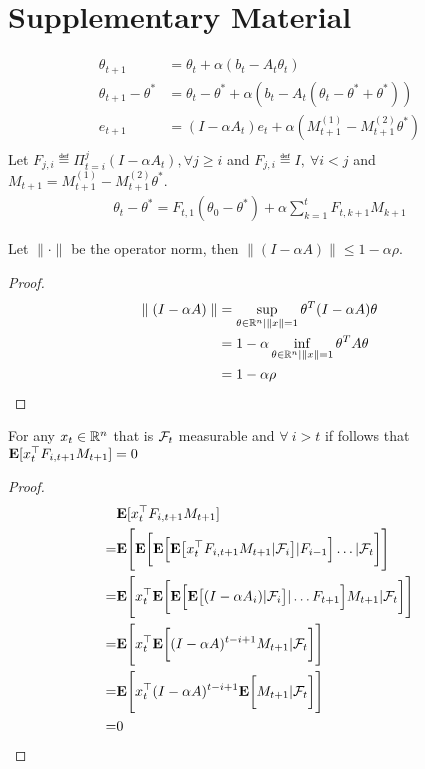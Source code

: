 \section{Supplementary Material}
\begin{align*}
\theta_{t+1}&=\theta_t+\alpha(b_t-A_t\theta_t)\\
\theta_{t+1}-\theta^*&=\theta_t-\theta^*+\alpha(b_t-A_t(\theta_t-\theta^*+\theta^*))\\
e_{t+1}&=(I-\alpha A_t) e_t+\alpha(M^{(1)}_{t+1} -M^{(2)}_{t+1}\theta^*)\\
\end{align*}
Let $F_{j,i}\eqdef\Pi_{t=i}^{j} (I-\alpha A_t), \forall j\geq i$ and $F_{j,i}\eqdef I,~\forall i<j$ and $M_{t+1}=M^{(1)}_{t+1}-M^{(2)}_{t+1}\theta^*$.
\begin{align}\label{exp}
\theta_t-\theta^*=F_{t,1}(\theta_0-\theta^*)+\alpha\sum_{k=1}^t F_{t,k+1} M_{k+1}
\end{align}
\begin{lemma}
Let $\parallel \cdot\parallel$ be the operator norm, then $\parallel (I-\alpha A)\parallel \leq 1-\alpha \rho$.
\end{lemma}
\begin{proof}
\begin{align*}
\parallel (I-\alpha A)\parallel&=\sup_{\theta\in \mathbb{R}^n | \parallel x\parallel=1}\theta^T (I-\alpha A) \theta\\
&=1-\alpha \inf_{\theta\in \mathbb{R}^n | \parallel x\parallel=1}\theta^T  A \theta\\
&=1-\alpha\rho
\end{align*}
\end{proof}
\begin{lemma}
For any $x_t\in \mathbb{R}^n$ that is $\mathcal{F}_t$ measurable and $\forall ~i > t$ if follows that $\mathbf{E}[x_t^\top F_{i,t+1}M_{t+1}]=0$
\end{lemma}
\small
\begin{proof}
\begin{align*}
&\mathbf{E}[x_t^\top F_{i,t+1}M_{t+1}]\\
=&\mathbf{E}\Bigg[\mathbf{E}\bigg[\mathbf{E}\Big[\mathbf{E}\big[ x_t^\top F_{i,t+1}M_{t+1}|\mathcal{F}_{i}\big]|F_{i-1}\Big]\ldots|\mathcal{F}_{t}\bigg]\Bigg]\\
=&\mathbf{E}\Bigg[ x_t^\top \mathbf{E}\bigg[\mathbf{E}\Big[\mathbf{E}\big[(I-\alpha A_i)|\mathcal{F}_{i}\big]|\ldots F_{t+1}\Big]M_{t+1}|\mathcal{F}_{t}\bigg]\Bigg]\\
=&\mathbf{E}\Bigg[ x_t^\top \mathbf{E}\bigg[(I-\alpha A)^{t-i+1}M_{t+1}|\mathcal{F}_{t}\bigg]\Bigg]\\
=&\mathbf{E}\Bigg[ x_t^\top (I-\alpha A)^{t-i+1}\mathbf{E}\bigg[M_{t+1}|\mathcal{F}_{t}\bigg]\Bigg]\\
=&0
\end{align*}
\end{proof}
